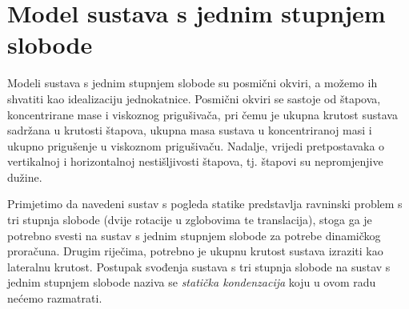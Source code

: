 \section{Model sustava s jednim stupnjem slobode}
Modeli sustava s jednim stupnjem slobode su posmični okviri, a možemo ih shvatiti
kao idealizaciju jednokatnice. Posmični okviri se sastoje od štapova, koncentrirane
mase i viskoznog prigušivača, pri čemu je ukupna krutost sustava sadržana u krutosti
štapova, ukupna masa sustava u koncentriranoj masi i ukupno prigušenje u viskoznom
prigušivaču. Nadalje, vrijedi pretpostavaka o vertikalnoj i horizontalnoj
nestišljivosti štapova, tj. štapovi su nepromjenjive dužine.


Primjetimo da navedeni sustav s pogleda statike predstavlja ravninski problem s tri
stupnja slobode (dvije rotacije u zglobovima te translacija), stoga ga je potrebno
svesti na sustav s jednim stupnjem slobode za potrebe dinamičkog proračuna. Drugim
riječima, potrebno je ukupnu krutost sustava izraziti kao lateralnu krutost.
Postupak svođenja sustava s tri stupnja slobode na sustav s jednim stupnjem slobode
naziva se \textit{statička kondenzacija} koju u ovom radu nećemo razmatrati.
\newpage

